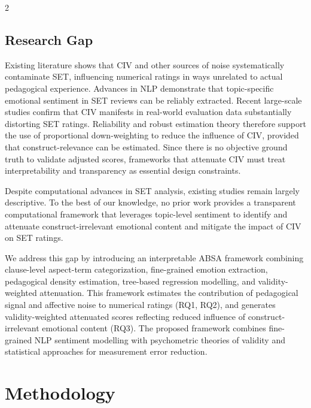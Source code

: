 \documentclass{article}
\begin{document}
\begin{multicols*}{2}
\subsection{Research Gap}
Existing literature shows that CIV and other sources of noise systematically contaminate SET, influencing numerical ratings in ways unrelated to actual pedagogical experience. Advances in NLP demonstrate that topic-specific emotional sentiment in SET reviews can be reliably extracted. Recent large-scale studies confirm that CIV manifests in real-world evaluation data substantially distorting SET ratings. Reliability and robust estimation theory therefore support the use of proportional down-weighting to reduce the influence of CIV, provided that construct-relevance can be estimated. Since there is no objective ground truth to validate adjusted scores, frameworks that attenuate CIV must treat interpretability and transparency as essential design constraints.

Despite computational advances in SET analysis, existing studies remain largely descriptive. To the best of our knowledge, no prior work provides a transparent computational framework that leverages topic-level sentiment to identify and attenuate construct-irrelevant emotional content and mitigate the impact of CIV on SET ratings.

We address this gap by introducing an interpretable ABSA framework combining clause-level aspect-term categorization, fine-grained emotion extraction, pedagogical density estimation, tree-based regression modelling, and validity-weighted attenuation. This framework estimates the contribution of pedagogical signal and affective noise to numerical ratings (RQ1, RQ2), and generates validity-weighted attenuated scores reflecting reduced influence of construct-irrelevant emotional content (RQ3). The proposed framework combines fine-grained NLP sentiment modelling with psychometric theories of validity and statistical approaches for measurement error reduction.
\section{Methodology}

\end{multicols*}
\end{document}

